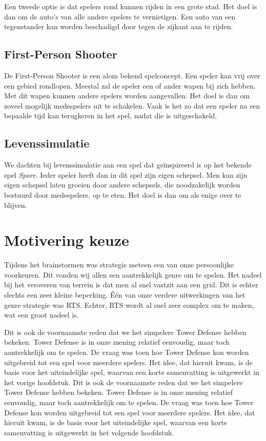 Een tweede optie is dat spelers rond kunnen rijden in een grote stad. Het doel is dan om de auto's van alle andere spelers te vernietigen. Een auto van een tegenstander kan worden beschadigd door tegen de zijkant aan te rijden.

\subsection{First-Person Shooter}
De First-Person Shooter is een alom bekend spelconcept. Een speler kan vrij over een gebied rondlopen. Meestal zal de speler een of ander wapen bij zich hebben. Met dit wapen kunnen andere spelers worden aangevallen. Het doel is dan om zoveel mogelijk medespelers uit te schakelen. Vaak is het zo dat een speler na een bepaalde tijd kan terugkeren in het spel, nadat die is uitgeschakeld.

\subsection{Levenssimulatie}
We dachten bij levenssimulatie aan een spel dat ge\"inspireerd is op het bekende spel \emph{Spore}. Ieder speler heeft dan in dit spel zijn eigen schepsel. Men kan zijn eigen schepsel laten groeien door andere schepsels, die noodzakelijk worden bestuurd door medespelers, op te eten. Het doel is dan om als enige over te blijven.

\section{Motivering keuze}
Tijdens het brainstormen was strategie meteen een van onze persoonlijke voorkeuren. Dit vonden wij allen een aantrekkelijk genre om te spelen. Het nadeel bij het veroveren van terrein is dat men al snel vastzit aan een grid. Dit is echter slechts een zeer kleine beperking. \'E\'en van onze verdere uitwerkingen van het genre strategie was RTS. Echter, RTS wordt al snel zeer complex om te maken, wat een groot nadeel is.

Dit is ook de voornaamste reden dat we het simpelere Tower Defense hebben bekeken. Tower Defense is in onze mening relatief eenvoudig, maar toch aantrekkelijk om te spelen. De vraag was toen hoe Tower Defense kon worden uitgebreid tot een spel voor meerdere spelers. Het idee, dat hieruit kwam, is de basis voor het uiteindelijke spel, waarvan een korte samenvatting is uitgewerkt in het vorige hoofdstuk.
Dit is ook de voornaamste reden dat we het simpelere Tower Defense hebben bekeken. Tower Defense is in onze mening relatief eenvoudig, maar toch aantrekkelijk om te spelen. De vraag was toen hoe Tower Defense kon worden uitgebreid tot een spel voor meerdere spelers. Het idee, dat hieruit kwam, is de basis voor het uiteindelijke spel, waarvan een korte samenvatting is uitgewerkt in het volgende hoofdstuk.

